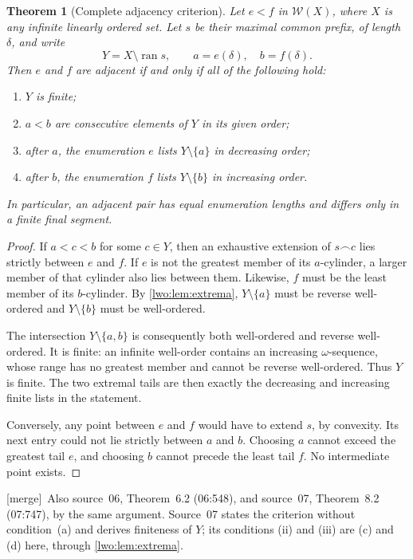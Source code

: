 \documentclass[11pt,a4paper]{article}
\newtheorem{theorem}{Theorem}[section]
\theoremstyle{definition}
\theoremstyle{remark}
\newcommand{\W}{\mathcal W}
\newcommand{\cat}{\mathbin{\frown}}
\newcommand{\ran}{\operatorname{ran}}
\newcommand{\merge}{\textsf{[merge]}}
\begin{document}
\begin{theorem}[Complete adjacency criterion]\label{lwo:thm:adjacency}
Let $e<f$ in $\W(X)$, where $X$ is any infinite linearly ordered set.
Let $s$ be their maximal common prefix, of length $\delta$, and write
\[
                Y=X\setminus\ran s,\qquad a=e(\delta),\quad b=f(\delta).
\]
Then $e$ and $f$ are adjacent if and only if all of the following hold:
\begin{enumerate}[label=(\alph*)]
\item $Y$ is finite;
\item $a<b$ are consecutive elements of $Y$ in its given order;
\item after $a$, the enumeration $e$ lists $Y\setminus\{a\}$ in decreasing
order;
\item after $b$, the enumeration $f$ lists $Y\setminus\{b\}$ in increasing
order.
\end{enumerate}
In particular, an adjacent pair has equal enumeration lengths and differs
only in a finite final segment.
\end{theorem}
\begin{proof}
If $a<c<b$ for some $c\in Y$, then an exhaustive extension of $s\cat c$
lies strictly between $e$ and $f$. If $e$ is not the greatest member of its
$a$-cylinder, a larger member of that cylinder also lies between them.
Likewise, $f$ must be the least member of its $b$-cylinder. By
\cref{lwo:lem:extrema}, $Y\setminus\{a\}$ must be reverse well-ordered and
$Y\setminus\{b\}$ must be well-ordered.

The intersection $Y\setminus\{a,b\}$ is consequently both well-ordered and
reverse well-ordered. It is finite: an infinite well-order contains an
increasing $\omega$-sequence, whose range has no greatest member and cannot
be reverse well-ordered. Thus $Y$ is finite. The two extremal tails are then
exactly the decreasing and increasing finite lists in the statement.

Conversely, any point between $e$ and $f$ would have to extend $s$, by
convexity. Its next entry could not lie strictly between $a$ and $b$.
Choosing $a$ cannot exceed the greatest tail $e$, and choosing $b$ cannot
precede the least tail $f$. No intermediate point exists.
\end{proof}
\merge\ Also source~06, Theorem~6.2 (06:548), and source~07,
Theorem~8.2 (07:747), by the same argument. Source~07 states the criterion
without condition~(a) and derives finiteness of $Y$; its conditions (ii) and
(iii) are (c) and (d) here, through \cref{lwo:lem:extrema}.
\end{document}
